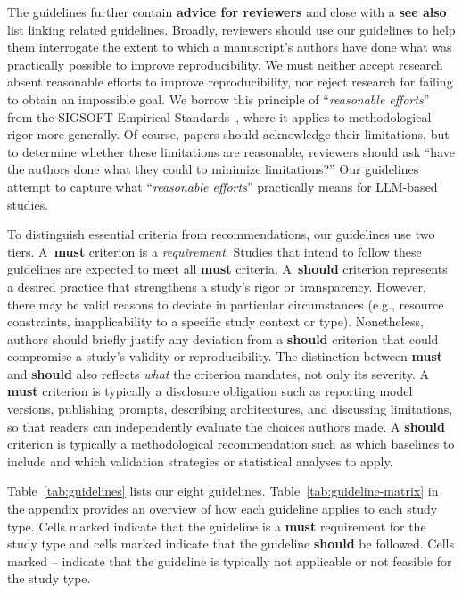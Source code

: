 \documentclass[smallextended]{svjour3}
\newif\ifpaper\papertrue
\newcommand*{\enq}[1]{\enquote{{\itshape#1}}}
\newcommand{\must}{\textbf{must}\xspace}
\newcommand{\should}{\textbf{should}\xspace}
\newcommand{\iconM}{\usebox{\iconMbox}\xspace}
\newcommand{\iconS}{\usebox{\iconSbox}\xspace}
\newcommand{\iconM}{●\xspace}
\newcommand{\iconS}{○\xspace}
\begin{document}
The guidelines further contain \textbf{advice for reviewers} and close with a \textbf{see also} list linking related guidelines.
Broadly, reviewers should use our guidelines to help them interrogate the extent to which a manuscript's authors have done what was practically possible to improve reproducibility. We must neither accept research absent reasonable efforts to improve reproducibility, nor reject research for failing to obtain an impossible goal. We borrow this principle of \enq{reasonable efforts} from the SIGSOFT Empirical Standards~\cite{ralph2021empiricalstandardssoftwareengineering}, where it applies to methodological rigor more generally. Of course, papers should acknowledge their limitations, but to determine whether these limitations are reasonable, reviewers should ask ``have the authors done what they could to minimize limitations?'' Our guidelines attempt to capture what \enq{reasonable efforts} practically means for LLM-based studies.

To distinguish essential criteria from recommendations, our guidelines use two tiers.
A~\must criterion is a \emph{requirement}. Studies that intend to follow these
guidelines are expected to meet all \must criteria.
A~\should criterion represents a desired practice that strengthens a study's rigor or transparency.
However, there may be valid reasons to deviate in particular circumstances (e.g., resource constraints, inapplicability to a specific study context or type).
Nonetheless, authors should briefly justify any deviation from a \should criterion that could compromise a study's validity or reproducibility.
The distinction between \must and \should also reflects \emph{what} the criterion mandates, not only its severity.
A \must criterion is typically a disclosure obligation such as reporting model versions, publishing prompts, describing architectures, and discussing limitations, so that readers can independently evaluate the choices authors made.
A \should criterion is typically a methodological recommendation such as which baselines to include and which validation strategies or statistical analyses to apply.
\ifpaper
Table~\ref{tab:guidelines} lists our eight guidelines.
Table~\ref{tab:guideline-matrix} in the appendix provides an overview of how each guideline applies to each study type.
Cells marked \iconM indicate that the guideline is a \must requirement for the study type and cells marked \iconS indicate that the guideline \should be followed.
Cells marked -- indicate that the guideline is typically not applicable or not feasible for the study type.
\fi
\end{document}
